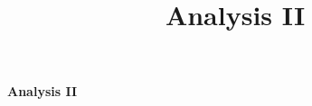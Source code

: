 \documentclass[a4paper,twocolumn]{scrartcl}
\title{Analysis II}
\begin{document}
\raggedright
\footnotesize

\begin{center}
     \Large{\textbf{Analysis II}} \\
\end{center}





\end{document}
